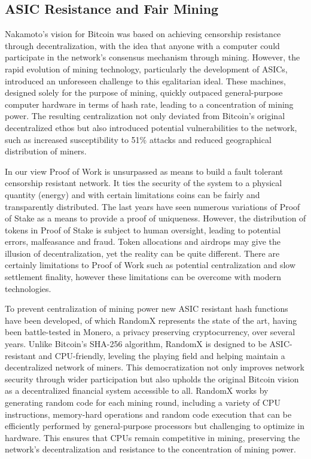 \documentclass{article}
\begin{document}
\subsection{ASIC Resistance and Fair Mining}

Nakamoto's vision for Bitcoin was based on achieving censorship resistance through decentralization, with the idea that anyone with a computer could participate in the network's consensus mechanism through mining. However, the rapid evolution of mining technology, particularly the development of ASICs, introduced an unforeseen challenge to this egalitarian ideal. These machines, designed solely for the purpose of mining, quickly outpaced general-purpose computer hardware in terms of hash rate, leading to a concentration of mining power. The resulting centralization not only deviated from Bitcoin's original decentralized ethos but also introduced potential vulnerabilities to the network, such as increased susceptibility to 51\% attacks and reduced geographical distribution of miners.

In our view Proof of Work is unsurpassed as means to build a fault tolerant censorship resistant network. It ties the security of the system to a physical quantity (energy) and with certain limitations coins can be fairly and transparently distributed. The last years have seen numerous variations of Proof of Stake as a means to provide a proof of uniqueness. However, the distribution of tokens in Proof of Stake is subject to human oversight, leading to potential errors, malfeasance and fraud. Token allocations and airdrops may give the illusion of decentralization, yet the reality can be quite different. There are certainly limitations to Proof of Work such as potential centralization and slow settlement finality, however these limitations can be overcome with modern technologies.

To prevent centralization of mining power new ASIC resistant hash functions have been developed, of which RandomX represents the state of the art, having been battle-tested in Monero, a privacy preserving cryptocurrency, over several years. Unlike Bitcoin's SHA-256 algorithm, RandomX is designed to be ASIC-resistant and CPU-friendly, leveling the playing field and helping maintain a decentralized network of miners. This democratization not only improves network security through wider participation but also upholds the original Bitcoin vision as a decentralized financial system accessible to all. RandomX works by generating random code for each mining round, including a variety of CPU instructions, memory-hard operations and random code execution that can be efficiently performed by general-purpose processors but challenging to optimize in hardware. This ensures that CPUs remain competitive in mining, preserving the network's decentralization and resistance to the concentration of mining power.
\end{document}

